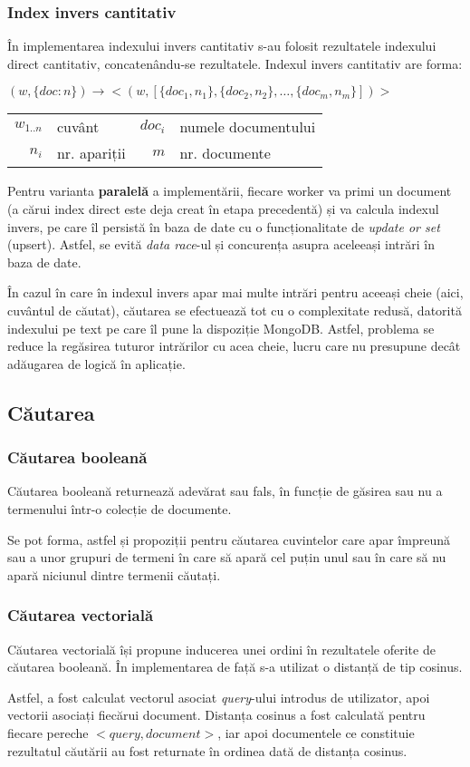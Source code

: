 \documentclass[12pt]{article}
\begin{document}
\subsubsection{Index invers cantitativ}
În implementarea indexului invers cantitativ s-au folosit rezultatele indexului direct cantitativ, concatenându-se rezultatele. Indexul invers cantitativ are forma:
\begin{center}
	$(w,\{doc:n\}) \longrightarrow <(w, [\{doc_{1}, n_{1}\}, \{doc_{2}, n_{2}\}, \dots, \{doc_{m}, n_{m}\}])>$
	\begin{tabular}{r@{: }l r@{: }l}
		$w_{1..n}$ & cuvânt & $doc_{i}$ & numele documentului\\
		$n_{i}$& nr. apariții & $m$ & nr. documente
	\end{tabular}
\end{center}
Pentru varianta \textbf{paralelă} a implementării, fiecare worker va primi un document (a cărui index direct este deja creat în etapa precedentă) și va calcula indexul invers, pe care îl persistă în baza de date cu o funcționalitate de \textit{update or set} (upsert). Astfel, se evită \textit{data race}-ul și concurența asupra aceleeași intrări în baza de date.
\par
În cazul în care în indexul invers apar mai multe intrări pentru aceeași cheie (aici, cuvântul de căutat), căutarea se efectuează tot cu o complexitate redusă, datorită indexului pe text pe care îl pune la dispoziție MongoDB. Astfel, problema se reduce la regăsirea tuturor intrărilor cu acea cheie, lucru care nu presupune decât adăugarea de logică în aplicație.
\subsection{Căutarea}
\subsubsection{Căutarea booleană}
Căutarea booleană returnează adevărat sau fals, în funcție de găsirea sau nu a termenului într-o colecție de documente.
\par
Se pot forma, astfel și propoziții pentru căutarea cuvintelor care apar împreună sau a unor grupuri de termeni în care să apară cel puțin unul sau în care să nu apară niciunul dintre termenii căutați.
\subsubsection{Căutarea vectorială}
Căutarea vectorială își propune inducerea unei ordini în rezultatele oferite de căutarea booleană. În implementarea de față s-a utilizat o distanță de tip cosinus.
\par
Astfel, a fost calculat vectorul asociat \textit{query}-ului introdus de utilizator, apoi vectorii asociați fiecărui document. Distanța cosinus a fost calculată pentru fiecare pereche $<query, document>$, iar apoi documentele ce constituie rezultatul căutării au fost returnate în ordinea dată de distanța cosinus.
\end{document}
